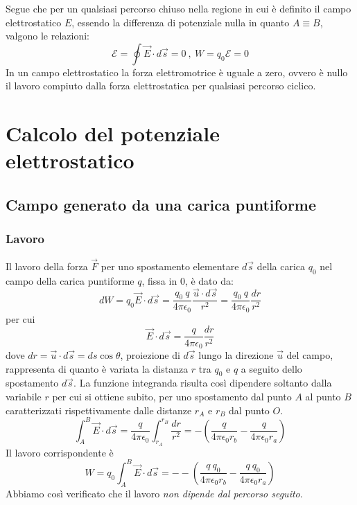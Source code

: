 \documentclass[class=book, crop=false, oneside, 12pt]{standalone}
\begin{document}
Segue che per un qualsiasi percorso chiuso nella regione in cui è definito il campo elettrostatico \(E\), essendo la differenza di potenziale nulla in quanto \(A \equiv B\), valgono le relazioni:
\begin{equation}
    \mathcal{E} = \oint \overrightarrow{E} \cdot d \overrightarrow{s} = 0 \ , \ W = q_0 \mathcal{E} = 0
\end{equation}
In un campo elettrostatico la forza elettromotrice è uguale a zero, ovvero è nullo il lavoro compiuto dalla forza elettrostatica per qualsiasi percorso ciclico.

\section{Calcolo del potenziale elettrostatico}

\subsection*{Campo generato da una carica puntiforme}

\subsubsection*{Lavoro}

Il lavoro della forza \(\overrightarrow{F}\) per uno spostamento elementare \(d \overrightarrow{s}\) della carica \(q_0\) nel campo della carica puntiforme \(q\), fissa in \(0\), è dato da:
\begin{equation*}
    d W = q_0 \overrightarrow{E} \cdot d \overrightarrow{s} = \frac{q_0 \ q}{4 \pi \epsilon_0} \frac{\overrightarrow{u} \cdot d \overrightarrow{s}}{r^2} = \frac{q_0 \ q}{ 4 \pi \epsilon_0} \frac{d r }{r^2}
\end{equation*}
per cui
\begin{equation*}
    \overrightarrow{E} \cdot d \overrightarrow{s} = \frac{q}{4 \pi \epsilon_0} \frac{d r }{r^2}
\end{equation*}
dove \(dr = \overrightarrow{u} \cdot d \overrightarrow{s} = ds \cos \theta\), proiezione di \(d \overrightarrow{s}\) lungo la direzione \(\overrightarrow{u}\) del campo, rappresenta di quanto è variata la distanza \(r\) tra \(q_0\) e \(q\) a seguito dello spostamento \(d \overrightarrow{s}\).  
La funzione integranda risulta così dipendere soltanto dalla variabile \(r\) per cui si ottiene subito, per uno spostamento dal punto \(A\) al punto \(B\) caratterizzati rispettivamente dalle distanze \(r_A\) e \(r_B\) dal punto \(O\).
\begin{equation}
    \int_A^B \overrightarrow{E} \cdot d \overrightarrow{s} = \frac{q}{4 \pi \epsilon_0} \int_{r_A}^{r_B} \frac{dr}{r^2} = - \left(\frac{q}{4 \pi \epsilon_0 r_b} - \frac{q}{4 \pi \epsilon_0 r_a}\right)
\end{equation}
Il lavoro corrispondente è
\begin{equation}
    W = q_0 \int_A^B \overrightarrow{E} \cdot d \overrightarrow{s} = -- \left (\frac{q \ q_0}{4 \pi \epsilon_0 r_b} - \frac{q \ q_0}{4 \pi \epsilon_0 r_a}\right)
\end{equation}
Abbiamo così verificato che il lavoro \emph{non dipende dal percorso seguito}.
\end{document}
